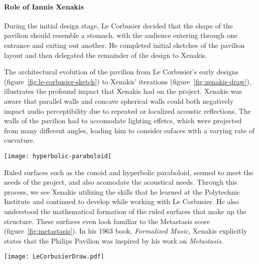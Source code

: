 \paragraph{Role of Iannis Xenakis} During the initial design stage, Le
Corbusier decided that the shape of the pavilion should resemble a
stomach, with the audience entering through one entrance and exiting
out another. He completed initial sketches of the pavilion layout and
then delegated the remainder of the design to
Xenakis.\cite[-3mm]{Clarke2012}

The architectural evolution of the pavilion from Le Corbusier's early
designs (figure~\ref{fig:le-corbusier-sketch}) to Xenakis' iterations
(figure~\ref{fig:xenakis-draw}), illustrates the profound impact that
Xenakis had on the project. Xenakis was aware that parallel walls and
concave spherical walls could both negatively impact audio
perceptibility due to repeated or localized acoustic reflections. The
walls of the pavilion had to accomodate lighting effetcs, which were
projected from many different angles, leading him to consider sufaces
with a varying rate of curvature.\cite{philips1958}
  \begin{marginfigure}
    \texttt{[image: hyperbolic-paraboloid]}
    \caption{A ruled surface. For a surface to be considered ``ruled''
      every point on the surface must be on a straight line, and that
      line must lie on the surface. In Xenakis' time, ruled surfaces
      were useful in architecture, because they simplified the
      construction of curved surfaces by using straight beams.}
    \label{fig:ruled-surface}
  \end{marginfigure}
Ruled surfaces such as the conoid and hyperbolic paraboloid, seemed to
meet the needs of the project, and also acomodate the acoustical needs.
Through this process, we see Xenakis utilizing the skills that he
learned at the Polytechnic Institute and continued to develop while
working with Le Corbusier. He also understood the mathematical
formation of the ruled surfaces that make up the structure. These
surfaces even look familiar to the Metastasis score
(figure~\ref{fig:metastasis}). In his 1963 book, \textit{Formalized
  Music}, Xenakis explicitly states that the Philips Pavilion was
inspired by his work on \textit{Metastasis}.

\begin{figure*}[]
  \texttt{[image: LeCorbusierDraw.pdf]}
  \caption{Le Corbusier's design sketches for the Philips Pavilion,
    September \textendash{} October, 1956 (\textcircled{c} 2012
    Artists Rights Society, New York/ADAGP, Paris/FLC)}
  \label{fig:le-corbusier-sketch}
\end{figure*}

